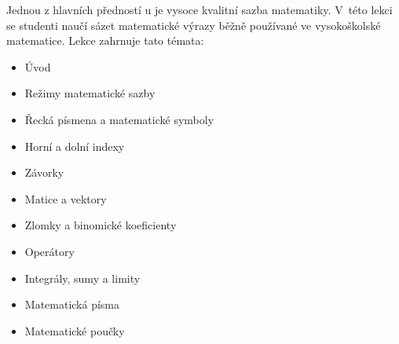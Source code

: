 {
	Jednou z hlavních předností u je vysoce kvalitní sazba matematiky. V~této lekci se studenti naučí sázet matematické výrazy běžně používané ve vysokoškolské matematice. Lekce zahrnuje tato témata:
	\begin{itemize}
		\item Úvod
		\item Režimy matematické sazby
		\item Řecká písmena a matematické symboly
		\item Horní a dolní indexy
		\item Závorky
		\item Matice a vektory
		\item Zlomky a binomické koeficienty
		\item Operátory
		\item Integrály, sumy a limity
		\item Matematická písma
		\item Matematické poučky
	\end{itemize}
}
\endinput
